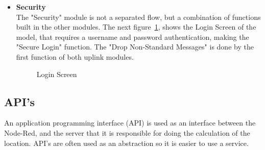 \begin{itemize}
   \item \textbf{Security} \\
    The "Security" module is not a separated flow, but a combination of functions built in the other modules. The next figure~\ref{fig:Secu}, shows the Login Screen of the model, that requires a username and password authentication, making the "Secure Login" function. The "Drop Non-Standard Messages" is done by the first function of both uplink modules.

 \begin{figure}[htbp]
  \centering
  \caption{Login Screen}
  \label{fig:Secu}
\end{figure}
\end{itemize}





\newpage

\subsection{API's }%
\label{sec:api}
An application programming interface (API) is used as an interface between the Node-Red, and the server that it is responsible for doing the calculation of the location. API's are often used as an abstraction so it is easier to use a service.

